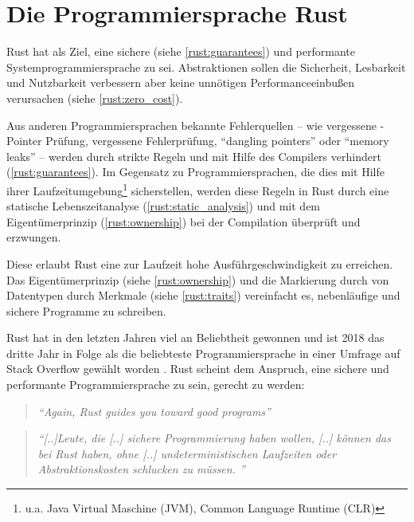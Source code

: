 
\chapter{Die Programmiersprache Rust}

Rust hat als Ziel, eine sichere (siehe \autoref{rust:guarantees}) und performante Systemprogrammiersprache zu sei.
Abstraktionen sollen die Sicherheit, Lesbarkeit und Nutzbarkeit verbessern aber keine unnötigen Performanceeinbußen verursachen (siehe \autoref{rust:zero_cost}).

Aus anderen Programmiersprachen bekannte Fehlerquellen -- wie vergessene -Pointer Prüfung, vergessene Fehlerprüfung, \enquote{dangling pointers} oder \enquote{memory leaks} --  werden durch strikte Regeln und mit Hilfe des Compilers verhindert (\autoref{rust:guarantees}).
Im Gegensatz zu Programmiersprachen, die dies mit Hilfe ihrer Laufzeitumgebung\footnote{u.a. Java Virtual Maschine (JVM), Common Language Runtime (CLR)} sicherstellen, werden diese Regeln in Rust durch eine statische Lebenszeitanalyse (\autoref{rust:static_analysis}) und mit dem Eigentümerprinzip (\autoref{rust:ownership}) bei der Compilation überprüft und erzwungen.

Diese erlaubt Rust eine zur Laufzeit hohe Ausführgeschwindigkeit zu erreichen.
Das Eigentümerprinzip (siehe \autoref{rust:ownership}) und die Markierung durch von Datentypen durch Merkmale (siehe \autoref{rust:traits}) vereinfacht es, nebenläufige und sichere Programme zu schreiben.

Rust hat in den letzten Jahren viel an Beliebtheit gewonnen und ist 2018 das dritte Jahr in Folge als die beliebteste Programmiersprache in einer Umfrage auf Stack Overflow gewählt worden \cite{rust:stack_overflow:mose_loved}.
Rust scheint dem Anspruch, eine sichere und performante Programmiersprache zu sein, gerecht zu werden:

\begin{quotation}
	\textit{\enquote{Again, Rust guides you toward good programs}}
	\cite[497]{rust:orly_programming}
\end{quotation}

\begin{quotation}
	\textit{\enquote{[..]Leute, die [..] sichere Programmierung haben wollen, [..] können das bei Rust haben, ohne [..] undeterministischen Laufzeiten oder Abstraktionskosten schlucken zu müssen. }}
	\cite[Felix von Leitner in einem Blogeintrag]{rust:fefe}
\end{quotation}

